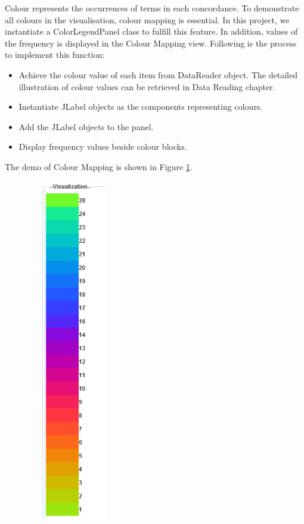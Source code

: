 Colour represents the occurrences of terms in each concordance. To demonstrate all colours in the visualisation, colour mapping is essential. In this project, we instantiate a ColorLegendPanel class to fulfill this feature. In addition, values of the frequency is displayed in the Colour Mapping view. Following is the process to implement this function: 
\begin{itemize}
	\item \textbf{} Achieve the colour value of each item from DataReader object. The detailed illustration of colour values can be retrieved in Data Reading chapter.
	\item \textbf{} Instantiate JLabel objects as the components representing colours.
	\item \textbf{} Add the JLabel objects to the panel.
	\item \textbf{} Display frequency values beside colour blocks.
\end{itemize}

The demo of Colour Mapping is shown in Figure \ref{fig:colourMapping}.
\begin{figure}[h]
	\centering	
	\includegraphics[width=4cm, height=15cm]{Figs/Color-Mapping}\\[1ex]
	\caption{}
	\label{fig:colourMapping}
\end{figure} 

